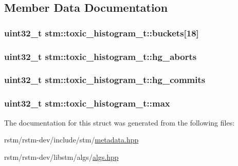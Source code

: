 \subsection{Member Data Documentation}
\hypertarget{structstm_1_1toxic__histogram__t_a4d9c243e216847f6ffdde9fb366ad7fe}{
\subsubsection[{buckets}]{\setlength{\rightskip}{0pt plus 5cm}uint32\-\_\-t stm\-::toxic\-\_\-histogram\-\_\-t\-::buckets\mbox{[}18\mbox{]}}}\label{structstm_1_1toxic__histogram__t_a4d9c243e216847f6ffdde9fb366ad7fe}
\hypertarget{structstm_1_1toxic__histogram__t_a474fe9e7bdd0f9924b646f7cc2c4a76d}{
\subsubsection[{hg\-\_\-aborts}]{\setlength{\rightskip}{0pt plus 5cm}uint32\-\_\-t stm\-::toxic\-\_\-histogram\-\_\-t\-::hg\-\_\-aborts}}\label{structstm_1_1toxic__histogram__t_a474fe9e7bdd0f9924b646f7cc2c4a76d}
\hypertarget{structstm_1_1toxic__histogram__t_ade96eca19424d8931f51a871d900b3a8}{
\subsubsection[{hg\-\_\-commits}]{\setlength{\rightskip}{0pt plus 5cm}uint32\-\_\-t stm\-::toxic\-\_\-histogram\-\_\-t\-::hg\-\_\-commits}}\label{structstm_1_1toxic__histogram__t_ade96eca19424d8931f51a871d900b3a8}
\hypertarget{structstm_1_1toxic__histogram__t_a827674af676c90eb51dc144ea61d522f}{
\subsubsection[{max}]{\setlength{\rightskip}{0pt plus 5cm}uint32\-\_\-t stm\-::toxic\-\_\-histogram\-\_\-t\-::max}}\label{structstm_1_1toxic__histogram__t_a827674af676c90eb51dc144ea61d522f}


The documentation for this struct was generated from the following files\-:\begin{DoxyCompactItemize}
\item 
rstm/rstm-\/dev/include/stm/\hyperlink{metadata_8hpp}{metadata.\-hpp}\item 
rstm/rstm-\/dev/libstm/algs/\hyperlink{algs_8hpp}{algs.\-hpp}\end{DoxyCompactItemize}
